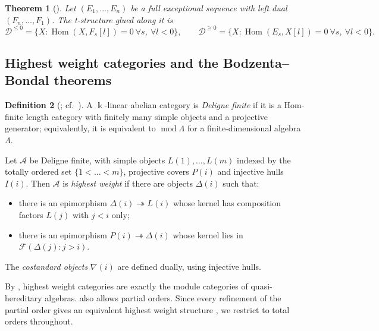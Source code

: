 \documentclass[11pt,reqno]{amsart}
\theoremstyle{plain}
\newtheorem{theorem}{Theorem}[section]
\theoremstyle{definition}
\newtheorem{definition}[theorem]{Definition}
\theoremstyle{remark}
\newcommand{\kk}{\Bbbk}
\DeclareMathOperator{\Hom}{Hom}
\newcommand{\modd}{\operatorname{mod}}
\newcommand{\cD}{\mathcal{D}}
\newcommand{\cA}{\mathcal{A}}
\newcommand{\cF}{\mathcal{F}}
\begin{document}
\begin{theorem}[{\cite[Lemma~2.4]{BB26}}]\label{thm:BB-2.4}
Let $(E_1,\dots,E_n)$ be a full exceptional sequence with left dual $(F_n,\dots,F_1)$. The t-structure glued along it is
\[\cD^{\le0}=\{X:\Hom(X,F_s[l])=0\ \forall s,\ \forall l<0\},\qquad \cD^{\ge0}=\{X:\Hom(E_s,X[l])=0\ \forall s,\ \forall l<0\}.\]
\end{theorem}

\subsection{Highest weight categories and the Bodzenta--Bondal theorems}

\begin{definition}[{\cite{CPS88}; cf.\ \cite[\S2.1]{BB26}}]\label{def:hw}
A $\kk$-linear abelian category is \emph{Deligne finite} if it is a Hom-finite length category with finitely many simple objects and a projective generator; equivalently, it is equivalent to $\modd\Lambda$ for a finite-dimensional algebra $\Lambda$.

Let $\cA$ be Deligne finite, with simple objects $L(1),\dots,L(m)$ indexed by the totally ordered set $\{1<\dots<m\}$, projective covers $P(i)$ and injective hulls $I(i)$. Then $\cA$ is \emph{highest weight} if there are objects $\Delta(i)$ such that:
\begin{itemize}
\item[(st1)] there is an epimorphism $\Delta(i)\twoheadrightarrow L(i)$ whose kernel has composition factors $L(j)$ with $j<i$ only;
\item[(st2)] there is an epimorphism $P(i)\twoheadrightarrow\Delta(i)$ whose kernel lies in $\cF(\Delta(j):j>i)$.
\end{itemize}
The \emph{costandard objects} $\nabla(i)$ are defined dually, using injective hulls.
\end{definition}

By \cite{CPS88}, highest weight categories are exactly the module categories of quasi-hereditary algebras. \cite{BB26} also allows partial orders. Since every refinement of the partial order gives an equivalent highest weight structure \cite[Rem.~2.3]{BB26}, we restrict to total orders throughout.
\end{document}
